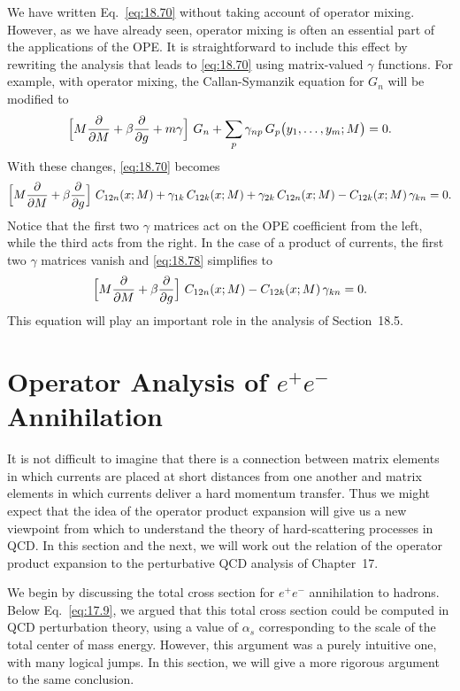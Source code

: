 We have written Eq.~\eqref{eq:18.70} without taking account of operator
mixing.  However, as we have already seen, operator mixing is often an
essential part of the applications of the OPE.  It is straightforward to
include this effect by rewriting the analysis that leads to \eqref{eq:18.70}
using matrix-valued $\gamma$ functions.  For example, with operator mixing,
the Callan-Symanzik equation for $G_n$ will be modified to
\begin{equation}
  \Bigl[ M\frac{\partial}{\partial M} + \beta\frac{\partial}{\partial g}
    + m\gamma \Bigr]\ G_n + \sum_p \gamma_{np}\,G_p\bigl( y_1, \ldots, y_m; M
    \bigr) = 0 .
  \label{eq:18.77}
\end{equation}
With these changes, \eqref{eq:18.70} becomes
\begin{equation}
  \Bigl[ M\frac{\partial}{\partial M} + \beta\frac{\partial}{\partial g}
    \Bigr]\ C_{12n}(x; M) + \gamma_{1k}\,C_{12k}(x; M)
    + \gamma_{2k}\,C_{12n}(x; M) - C_{12k}(x; M)\,\gamma_{kn} = 0 .
  \label{eq:18.78}
\end{equation}
Notice that the first two $\gamma$ matrices act on the OPE coefficient from
the left, while the third acts from the right.  In the case of a product of
currents, the first two $\gamma$ matrices vanish and \eqref{eq:18.78}
simplifies to
\begin{equation}
  \Bigl[ M\frac{\partial}{\partial M} + \beta\frac{\partial}{\partial g}
    \Bigr]\ C_{12n}(x; M) - C_{12k}(x; M)\,\gamma_{kn} = 0 .
  \label{eq:18.79}
\end{equation}
This equation will play an important role in the analysis of Section~18.5.

\section{Operator Analysis of $e^{+}e^{-}$ Annihilation}

It is not difficult to imagine that there is a connection between matrix
elements in which currents are placed at short distances from one another and
matrix elements in which currents deliver a hard momentum transfer.  Thus we
might expect that the idea of the operator product expansion will give us a
new viewpoint from which to understand the theory of hard-scattering
processes in QCD.  In this section and the next, we will work out the relation
of the operator product expansion to the perturbative QCD analysis of
Chapter~17.

We begin by discussing the total cross section for $e^{+}e^{-}$ annihilation
to hadrons.  Below Eq.~\eqref{eq:17.9}, we argued that this total cross
section could be computed in QCD perturbation theory, using a value of
$\alpha_s$ corresponding to the scale of the total center of mass energy.
However, this argument was a purely intuitive one, with many logical jumps.
In this section, we will give a more rigorous argument to the same
conclusion.

